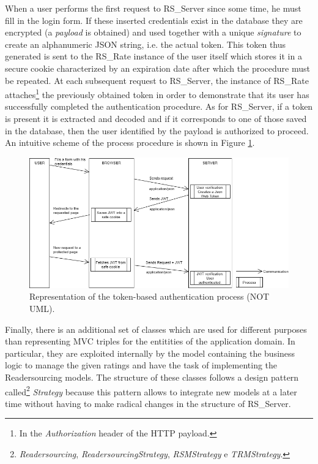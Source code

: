 \documentclass[a4paper, english]{article}
\begin{document}
When a user performs the first request to RS\_Server since some time, he must fill in the login form. If these inserted credentials exist in the database they are encrypted (a \emph{payload} is obtained) and used together with a unique \emph{signature} to create an alphanumeric JSON string, i.e. the actual token. This token thus generated is sent to the RS\_Rate instance of the user itself which stores it in a secure cookie characterized by an expiration date after which the procedure must be repeated. At each subsequent request to RS\_Server, the instance of RS\_Rate attaches\footnote{In the \emph{Authorization} header of the HTTP payload.} the previously obtained token in order to demonstrate that its user has successfully completed the authentication procedure. As for RS\_Server, if a token is present it is extracted and decoded and if it corresponds to one of those saved in the database, then the user identified by the payload is authorized to proceed. An intuitive scheme of the process procedure is shown in Figure \ref{fig:auth}.

\begin{figure}[!tbp]
\centering
\includegraphics[width=\textwidth]{figures/autenticazione.png}
\caption{Representation of the token-based authentication process (NOT UML).}
\label{fig:auth}
\end{figure}

Finally, there is an additional set of classes which are used for different purposes than representing MVC triples for the entitities of the application domain. In particular, they are exploited internally by the model containing the business logic to manage the given ratings and have the task of implementing the Readersourcing models. The structure of these classes follows a design pattern called\footnote{\emph{Readersourcing}, \emph{ReadersourcingStrategy}, \emph{RSMStrategy} e \emph{TRMStrategy}.} \emph{Strategy} because this pattern allows to integrate new models at a later time without having to make radical changes in the structure of RS\_Server.
\end{document}

